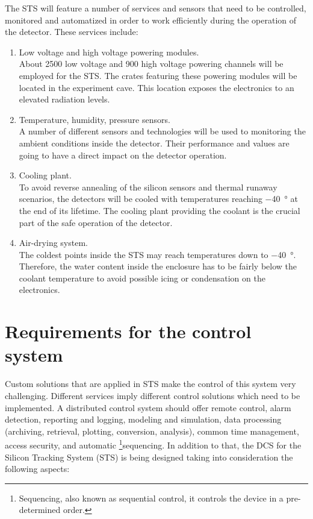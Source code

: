 The \gls{STS} will feature a number of services and sensors that need to be controlled, monitored and automatized in order to work efficiently during the operation of the detector. These services include:
\begin{enumerate}
    \item Low voltage and high voltage powering modules.\\
    About 2500 low voltage and 900 high voltage powering channels will be employed for the \gls{STS}. The crates featuring these powering modules will be located in the experiment cave. This location exposes the electronics to an elevated radiation levels. 
    \item Temperature, humidity, pressure sensors.\\
    A number of different sensors and technologies will be used to monitoring the ambient conditions inside the detector. Their performance and values are going to have a direct impact on the detector operation.
    \item Cooling plant.\\
    To avoid reverse annealing of the silicon sensors and thermal runaway scenarios, the detectors will be cooled with temperatures reaching \SI{-40}{\degree} at the end of its lifetime. The cooling plant providing the coolant is the crucial part of the safe operation of the detector.
    \item Air-drying system.\\
    The coldest points inside the \gls{STS} may reach temperatures down to \SI{-40}{\degree}. Therefore, the water content inside the enclosure has to be fairly below the coolant temperature to avoid possible icing or condensation on the electronics.
 \end{enumerate}



\section{Requirements for the control system}
\label{sys:req}
Custom solutions that are applied in \gls{STS} make the control of this system very challenging. Different services imply different control solutions which need to be implemented.
A distributed control system should offer remote control, alarm detection, reporting and logging, modeling and simulation, data processing (archiving, retrieval, plotting, conversion, analysis), common time management, access security, and automatic \footnote{Sequencing, also known as sequential control, it controls the device in a pre-determined order.}{sequencing}.
In addition to that, the \gls{DCS} for the Silicon Tracking System (\gls{STS}) is being designed taking into consideration the following aspects:

